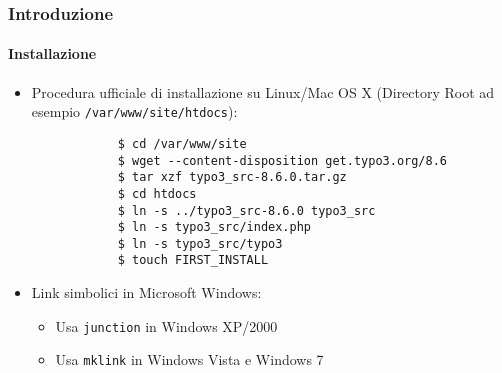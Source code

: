 \begin{frame}[fragile]
	\frametitle{Introduzione}
	\framesubtitle{Installazione}

	\begin{itemize}
		\item Procedura ufficiale di installazione su Linux/Mac OS X\newline
			(Directory Root ad esempio \texttt{/var/www/site/htdocs}):
		\begin{lstlisting}
			$ cd /var/www/site
			$ wget --content-disposition get.typo3.org/8.6
			$ tar xzf typo3_src-8.6.0.tar.gz
			$ cd htdocs
			$ ln -s ../typo3_src-8.6.0 typo3_src
			$ ln -s typo3_src/index.php
			$ ln -s typo3_src/typo3
			$ touch FIRST_INSTALL
		\end{lstlisting}

		\item Link simbolici in Microsoft Windows:

			\begin{itemize}
				\item Usa \texttt{junction} in Windows XP/2000
				\item Usa \texttt{mklink} in Windows Vista e Windows 7
			\end{itemize}

	\end{itemize}
\end{frame}

